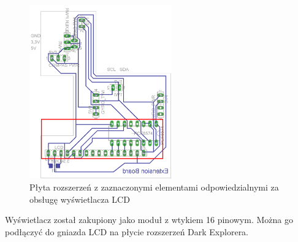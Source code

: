 \begin{figure}[!ht]
 \centering
 \includegraphics[height=75mm]{../images/ch04/extension_board-LCD.png}
 \caption{Płyta rozszerzeń z zaznaczonymi elementami odpowiedzialnymi za obsługę wyświetlacza LCD}
 \label{fig:ExBoardWithLCD}
\end{figure}

Wyświetlacz został zakupiony jako moduł z wtykiem 16 pinowym. Można go podłączyć
do gniazda LCD na płycie rozszerzeń Dark Explorera.
